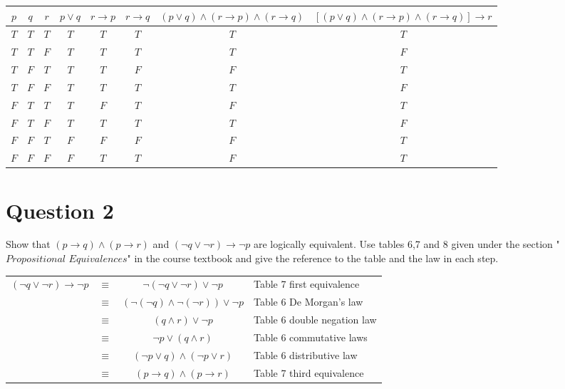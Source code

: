 \documentclass[a4paper,12pt]{article}
\newcommand\tab[1][1cm]{\hspace*{#1}}
\begin{document}
\begin{tcolorbox}
    \centering
    \begin{tabular}{|c c c|c|c|c|c|c}
        $p$ & $q$ & $r$ & $p \lor q$ & $r \rightarrow p$ & $r \rightarrow q$ & $(p \lor q) \land (r \rightarrow p) \land (r \rightarrow q)$ & $[(p \lor q) \land (r \rightarrow p) \land (r \rightarrow q)] \rightarrow r$\\
        \hline
        $T$ & $T$ & $T$ & $T$ & $T$ & $T$ & $T$ & $T$ \\
        $T$ & $T$ & $F$ & $T$ & $T$ & $T$ & $T$ & $F$ \\
        $T$ & $F$ & $T$ & $T$ & $T$ & $F$ & $F$ & $T$ \\
        $T$ & $F$ & $F$ & $T$ & $T$ & $T$ & $T$ & $F$ \\
        $F$ & $T$ & $T$ & $T$ & $F$ & $T$ & $F$ & $T$ \\
        $F$ & $T$ & $F$ & $T$ & $T$ & $T$ & $T$ & $F$ \\
        $F$ & $F$ & $T$ & $F$ & $F$ & $F$ & $F$ & $T$ \\
        $F$ & $F$ & $F$ & $F$ & $T$ & $T$ & $F$ & $T$ 
    \end{tabular}
\end{tcolorbox}

\newpage
\section*{Question 2 \hfill {}}
\tab Show that $(p \rightarrow q) \wedge (p \rightarrow r)$ and $(\neg q \vee \neg r)\rightarrow \neg p$ are logically equivalent. Use tables 6,7 and 8 given under the section "$\textit{Propositional Equivalences}$" in the course textbook and give the reference to the table and the law in each step.

\begin{tcolorbox}
\begin{table}[H]
    \centering
    \begin{tabular}{ccc|l}
        $( \lnot q \lor \lnot r) \rightarrow \lnot p$ & $\equiv$ & $\lnot (\lnot q \lor \lnot r) \lor \lnot p$ & Table 7 first equivalence \\
        & $\equiv$ & $(\lnot (\lnot q) \land \lnot (\lnot r)) \lor \lnot p$ & Table 6 De Morgan's law \\
        & $\equiv$ & $( q \land r) \lor \lnot p$ & Table 6 double negation law \\
        & $\equiv$ & $\lnot p \lor ( q \land r)$ & Table 6 commutative laws \\
        & $\equiv$ & $(\lnot p \lor q) \land (\lnot p \lor r)$ & Table 6 distributive law \\
        & $\equiv$ & $(p \rightarrow q) \land (p \rightarrow r)$ & Table 7 third equivalence \\
    \end{tabular}
\end{table}

\end{tcolorbox}
\end{document}
